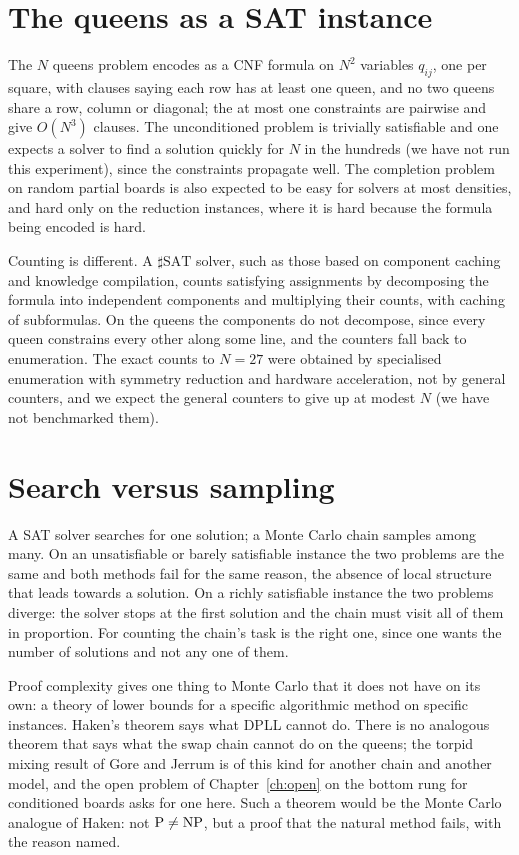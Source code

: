\section{The queens as a SAT instance}

The $N$ queens problem encodes as a CNF formula on $N^2$ variables $q_{ij}$, one per square, with clauses saying each row has at least one queen, and no two queens share a row, column or diagonal; the at most one constraints are pairwise and give $O(N^3)$ clauses. The unconditioned problem is trivially satisfiable and one expects a solver to find a solution quickly for $N$ in the hundreds (we have not run this experiment), since the constraints propagate well. The completion problem on random partial boards is also expected to be easy for solvers at most densities, and hard only on the reduction instances, where it is hard because the formula being encoded is hard.

Counting is different. A $\sharp\mathrm{SAT}$ solver, such as those based on component caching and knowledge compilation, counts satisfying assignments by decomposing the formula into independent components and multiplying their counts, with caching of subformulas. On the queens the components do not decompose, since every queen constrains every other along some line, and the counters fall back to enumeration. The exact counts to $N = 27$ were obtained by specialised enumeration with symmetry reduction and hardware acceleration, not by general counters, and we expect the general counters to give up at modest $N$ (we have not benchmarked them).

\section{Search versus sampling}

A SAT solver searches for one solution; a Monte Carlo chain samples among many. On an unsatisfiable or barely satisfiable instance the two problems are the same and both methods fail for the same reason, the absence of local structure that leads towards a solution. On a richly satisfiable instance the two problems diverge: the solver stops at the first solution and the chain must visit all of them in proportion. For counting the chain's task is the right one, since one wants the number of solutions and not any one of them.

Proof complexity gives one thing to Monte Carlo that it does not have on its own: a theory of lower bounds for a specific algorithmic method on specific instances. Haken's theorem says what DPLL cannot do. There is no analogous theorem that says what the swap chain cannot do on the queens; the torpid mixing result of Gore and Jerrum is of this kind for another chain and another model, and the open problem of Chapter~\ref{ch:open} on the bottom rung for conditioned boards asks for one here. Such a theorem would be the Monte Carlo analogue of Haken: not $\mathrm{P} \neq \mathrm{NP}$, but a proof that the natural method fails, with the reason named.

